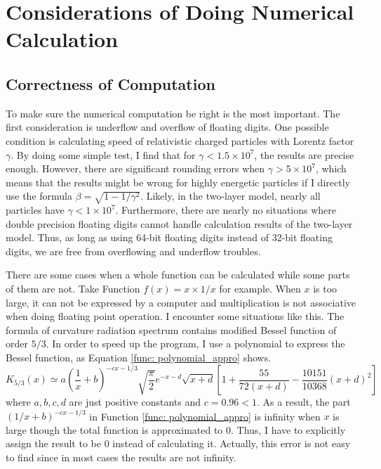 \documentclass[12pt]{report}
\begin{document}
  

  \section{Considerations of Doing Numerical Calculation}
    \subsection{Correctness of Computation}
      To make sure the numerical computation be right is the most important. 
      The first consideration is underflow and overflow of floating digits.
      One possible condition is calculating speed of relativistic charged particles with 
      Lorentz factor $\gamma$. By doing some simple test, I find that for 
      $\gamma < 1.5\times 10^7$, the results are precise enough. However, there are 
      significant rounding errors when $\gamma > 5\times 10^7$, which means that the 
      results might be wrong for highly energetic particles if I directly use the formula 
      $\beta = \sqrt{1 - 1/\gamma^2}$.
      Likely, in the two-layer model, nearly all particles have $\gamma < 1\times 10^7$. 
      Furthermore, there are nearly no situations where double precision floating digits
      cannot handle calculation results of the two-layer model. Thus, as long as using 
      64-bit floating digits instead of 32-bit floating digits, we are free from overflowing 
      and underflow troubles. 
        
      There are some cases when a whole function can be calculated while some parts of them 
      are not. Take Function $f\left(x\right) = x\times1/x$ for example. When $x$ is too 
      large, it can not be expressed by a computer and multiplication is not associative when 
      doing floating point operation. I encounter some situations like this.
      The formula of curvature radiation spectrum contains modified Bessel function of order 
      $5/3$. In order to speed up the program, I use a polynomial to express the Bessel 
      function, as Equation \ref{func: polynomial_appro} shows. 
      \begin{equation}
        K_{5/3} \left(x\right) \simeq a \left(\frac{1}{x} + b\right)^{-cx - 1/3} \sqrt{\frac{\pi}{2}} e^{-x - d} \sqrt{x + d} %
        \left[1 + \frac{55}{72\left(x + d\right)} - \frac{10151}{10368}\left(x+d\right)^2\right] 
        \label{func: polynomial_appro}
      \end{equation}
      where $a,b,c,d$ are just positive constants and $c = 0.96 < 1$. As a result, 
      the part $(1/x + b)^{-cx - 1/3}$ in Function \ref{func: polynomial_appro} is infinity
      when $x$ is large though the total function is approximated to $0$. Thus, I have to 
      explicitly assign the result to be $0$ instead of calculating it. Actually, this error 
      is not easy to find since in most cases the results are not infinity. 
          
\end{document}
